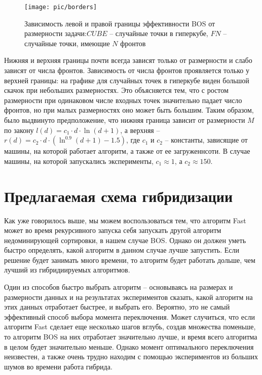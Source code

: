 \begin{figure}
\begin{center}
\texttt{[image: pic/borders]}
\caption{Зависимость левой и правой границы эффективности BOS от размерности задачи:$CUBE$ -- случайные точки в гиперкубе, $FN$ -- случайные точки, имеющие $N$ фронтов}
\label{borders}
\end{center}
\end{figure}

Нижняя и верхняя границы почти всегда зависят только от размерности и слабо зависят от числа фронтов. Зависимость
от числа фронтов проявляется только у верхней границы: на графике для случайных точек в гиперкубе виден большой
скачок при небольших размерностях. Это объясняется тем, что с ростом размерности при одинаковом числе входных
точек значительно падает число фронтов, но при малых размерностях оно может быть большим. Таким образом, было
выдвинуто предположение, что нижняя граница зависит от размерности $M$ по закону $l(d) = c_1 \cdot d \cdot \ln(d + 1)$,
а верхняя -- $r(d) = c_2 \cdot d \cdot (\ln^{0.9}(d + 1) - 1.5)$, где $c_1$  и $c_2$ -- константы, зависящие от
машины, на которой работает алгоритм, а также от ее загруженнсоти. В случае машины, на которой запускались
эксперименты, $c_1 \approx 1$, а $c_2 \approx 150$.

\section{Предлагаемая схема гибридизации}

Как уже говорилось выше, мы можем воспользоваться тем, что алгоритм Fast может во время рекурсивного запуска
себя запускать другой алгоритм недоминирующей сортировки, в нашем случае BOS. Однако он должен уметь быстро
определять, какой алгоритм в данном случае лучше запустить. Если решение будет занимать много времени, то
алгоритм будет работать дольше, чем лучший из гибридиируемых алгоритмов.

Один из способов быстро выбрать алгоритм -- основываясь на размерах и размерности данных и на результатах
экспериментов сказать, какой алгоритм на этих данных отработает быстрее, и выбрать его. Вероятно, это не самый
эффективный способ выбора момента переключения. Может случиться, что если алгоритм Fast сделает еще несколько шагов
вглубь, создав множества поменьше, то алгоритм BOS на них отработает значительно лучше, и время всего алгоритма в
целом будет значительно меньше. Однако момент оптимального переключения неизвестен, а также очень трудно находим
с помощью экспериментов из больших шумов во времени работа гибрида.

